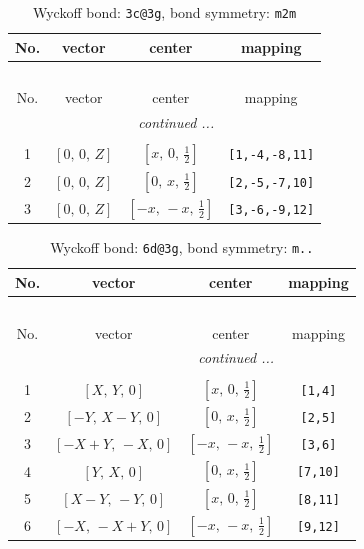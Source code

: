 \documentclass[fleqn,8pt]{jsarticle}
\begin{document}
\renewcommand{\arraystretch}{1.2}
\begin{longtable}{cccc}
\caption{Wyckoff bond: {\tt 3c@3g}, bond symmetry: {\tt m2m}}
 \\
 \hline \hline
No. & vector & center & mapping \\ \hline \endfirsthead

\multicolumn{3}{l}{\tablename\ \thetable{}} \\
 \hline \hline
No. & vector & center & mapping \\ \hline \endhead

 \hline \hline
\multicolumn{3}{r}{\footnotesize\it continued ...} \\ \endfoot

 \hline \hline
\multicolumn{3}{r}{} \\ \endlastfoot

1 & $\left[ 0,\, 0,\, Z \right]$ & $\left[ x,\, 0,\, \frac{1}{2} \right]$ & {\tt [1,-4,-8,11]} \\ \hline
2 & $\left[ 0,\, 0,\, Z \right]$ & $\left[ 0,\, x,\, \frac{1}{2} \right]$ & {\tt [2,-5,-7,10]} \\ \hline
3 & $\left[ 0,\, 0,\, Z \right]$ & $\left[ - x,\, - x,\, \frac{1}{2} \right]$ & {\tt [3,-6,-9,12]} \\
\end{longtable}
\renewcommand{\arraystretch}{1.2}
\begin{longtable}{cccc}
\caption{Wyckoff bond: {\tt 6d@3g}, bond symmetry: {\tt m..}}
 \\
 \hline \hline
No. & vector & center & mapping \\ \hline \endfirsthead

\multicolumn{3}{l}{\tablename\ \thetable{}} \\
 \hline \hline
No. & vector & center & mapping \\ \hline \endhead

 \hline \hline
\multicolumn{3}{r}{\footnotesize\it continued ...} \\ \endfoot

 \hline \hline
\multicolumn{3}{r}{} \\ \endlastfoot

1 & $\left[ X,\, Y,\, 0 \right]$ & $\left[ x,\, 0,\, \frac{1}{2} \right]$ & {\tt [1,4]} \\ \hline
2 & $\left[ - Y,\, X - Y,\, 0 \right]$ & $\left[ 0,\, x,\, \frac{1}{2} \right]$ & {\tt [2,5]} \\ \hline
3 & $\left[ - X + Y,\, - X,\, 0 \right]$ & $\left[ - x,\, - x,\, \frac{1}{2} \right]$ & {\tt [3,6]} \\ \hline
4 & $\left[ Y,\, X,\, 0 \right]$ & $\left[ 0,\, x,\, \frac{1}{2} \right]$ & {\tt [7,10]} \\ \hline
5 & $\left[ X - Y,\, - Y,\, 0 \right]$ & $\left[ x,\, 0,\, \frac{1}{2} \right]$ & {\tt [8,11]} \\ \hline
6 & $\left[ - X,\, - X + Y,\, 0 \right]$ & $\left[ - x,\, - x,\, \frac{1}{2} \right]$ & {\tt [9,12]} \\
\end{longtable}
\end{document}
